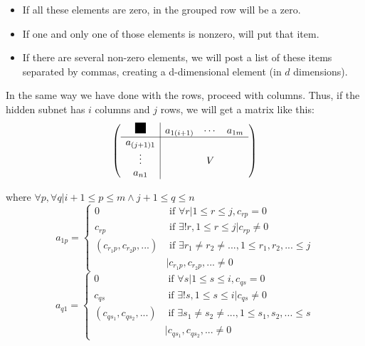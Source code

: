 {\begin{itemize}
\item If all these elements are zero, in the grouped row will be a zero.
\item If one and only one of those elements is nonzero, will put that item.
\item If there are several non-zero elements, we will post a list of these items separated by commas, creating a d-dimensional element (in $ d $ dimensions).
\end{itemize}

In the same way we have done with the rows, proceed with columns. Thus, if the hidden subnet has $ i $ columns and $ j $ rows, we will get a matrix
like this:
\[
\left(
\begin{array}{c|ccc}
 \rule{0.15in}{0.15in} & a_{1(i+1)} & \cdots & a_{1m} \\
 \cline{1-4} 
 a_{(j+1)1} & &   & \\
 \vdots & & V & \\
 a_{n1} & &   & \\
\end{array}
\right)
\]

where $\forall p, \forall q |  i+1\le p \le m \land j+1\le q \le n$
\[
a_{1p}=\left\{ \begin{array}{ll}
0 & \mbox{ if }\forall r | 1 \le r \le j, c_{rp}=0\\
c_{rp}& \mbox{ if } \exists! r, 1 \le r \le j | c_{rp}\neq0\\
(c_{r_1p}, c_{r_2p},...) & \mbox{ if }\exists r_1\neq r_2 \neq ..., 1 \le r_1, r_2,... \le j\\& |c_{r_1p},c_{r_2p},...\neq0
\end{array}\right.
\]
\[
a_{q1}=\left\{ \begin{array}{ll}
0 & \mbox{ if }\forall s | 1 \le s \le i, c_{qs}=0\\
c_{qs}& \mbox{ if } \exists! s, 1 \le s \le i | c_{qs}\neq0\\
(c_{qs_1}, c_{qs_2},...) & \mbox{ if }\exists s_1\neq s_2 \neq ..., 1 \le s_1, s_2,... \le s\\& |c_{qs_1},c_{qs_2},...\neq 0
\end{array}\right.
\]

}
